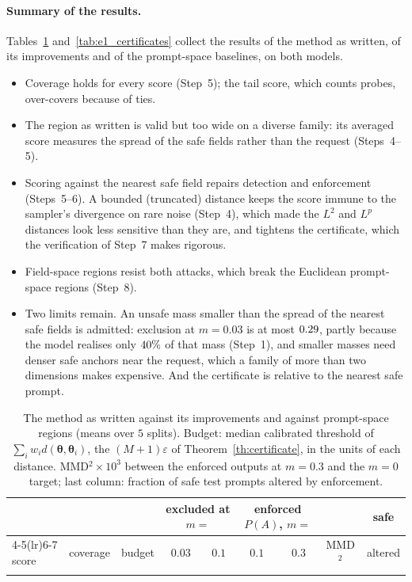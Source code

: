 \documentclass{article}
\newcommand{\bth}{\boldsymbol{\theta}}
\theoremstyle{plain}
\theoremstyle{remark}
\begin{document}
\paragraph{Summary of the results.}
Tables~\ref{tab:e1_detection} and~\ref{tab:e1_certificates} collect the results of the method as written, of its improvements and of the
prompt-space baselines, on both models.
\begin{itemize}
\item Coverage holds for every score (Step~5); the tail score, which counts probes, over-covers because of ties.
\item The region as written is valid but too wide on a diverse family: its averaged score measures the spread of the
safe fields rather than the request (Steps~4--5).
\item Scoring against the nearest safe field repairs detection and enforcement (Steps~5--6). A bounded (truncated) distance
keeps the score immune to the sampler's divergence on rare noise (Step~4), which made the $L^2$ and $L^p$ distances look less
sensitive than they are, and tightens the certificate, which the verification of Step~7 makes rigorous.
\item Field-space regions resist both attacks, which break the Euclidean prompt-space regions (Step~8).
\item Two limits remain. An unsafe mass smaller than the spread of the nearest safe fields is admitted: exclusion at
$m=0.03$ is at most $0.29$, partly because the model realises only $40\%$ of that mass (Step~1), and smaller masses
need denser safe anchors near the request, which a family of more than two dimensions makes expensive. And the certificate
is relative to the nearest safe prompt.
\end{itemize}

\begin{table}[!htbp]
\centering
\caption{The method as written against its improvements and against prompt-space regions (means over $5$
splits). Budget: median calibrated threshold of $\sum_iw_id(\bth,\bth_i)$, the $(M+1)\varepsilon$ of
Theorem~\ref{th:certificate}, in the units of each distance. MMD$^2\times10^3$ between the enforced outputs at $m=0.3$
and the $m=0$ target; last column: fraction of safe test prompts altered by enforcement.}
\label{tab:e1_detection}
\small
\begin{tabular}{l c c cc cc c c}
\toprule
& & & \multicolumn{2}{c}{excluded at $m=$} & \multicolumn{2}{c}{enforced $P(A)$, $m=$} & & safe\\
\cmidrule(lr){4-5}\cmidrule(lr){6-7}
score & coverage & budget & $0.03$ & $0.1$ & $0.1$ & $0.3$ & MMD$^2$ & altered\\
\midrule
{}{tables/e1_detection.tex}
\bottomrule
\end{tabular}
\end{table}
\end{document}
